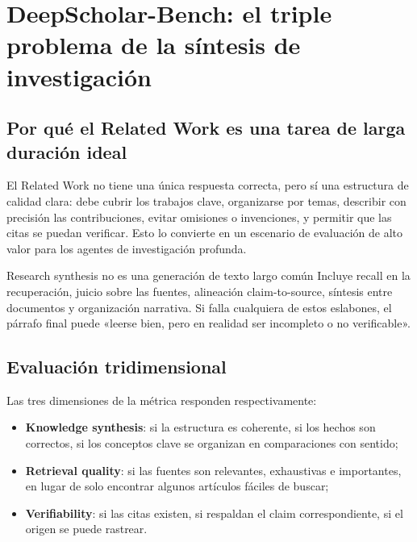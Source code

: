 \section{DeepScholar-Bench: el triple problema de la síntesis de investigación}

\subsection{Por qué el Related Work es una tarea de larga duración ideal}



El Related Work no tiene una única respuesta correcta, pero sí una estructura de calidad clara: debe cubrir los trabajos clave, organizarse por temas, describir con precisión las contribuciones, evitar omisiones o invenciones, y permitir que las citas se puedan verificar. Esto lo convierte en un escenario de evaluación de alto valor para los agentes de investigación profunda.

\begin{knowledgebox}{Research synthesis no es una generación de texto largo común}
Incluye recall en la recuperación, juicio sobre las fuentes, alineación claim-to-source, síntesis entre documentos y organización narrativa. Si falla cualquiera de estos eslabones, el párrafo final puede «leerse bien, pero en realidad ser incompleto o no verificable».
\end{knowledgebox}

\subsection{Evaluación tridimensional}


Las tres dimensiones de la métrica responden respectivamente:

\begin{itemize}
    \item \textbf{Knowledge synthesis}: si la estructura es coherente, si los hechos son correctos, si los conceptos clave se organizan en comparaciones con sentido;
    \item \textbf{Retrieval quality}: si las fuentes son relevantes, exhaustivas e importantes, en lugar de solo encontrar algunos artículos fáciles de buscar;
    \item \textbf{Verifiability}: si las citas existen, si respaldan el claim correspondiente, si el origen se puede rastrear.
\end{itemize}

